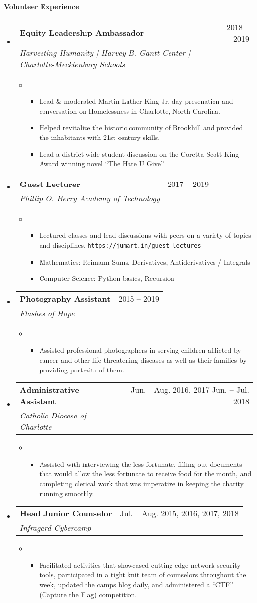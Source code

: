 \documentclass[letterpaper,10pt,draft]{article}
\makeatletter
\newlength{\outerbordwidth}
\newcommand{\openitem}[2]{\item[] \textbf{#1} #2\vspace{2pt}}
\newcommand{\secheading}[1]{\vspace{2pt}
{
\setlength{\FrameSep}{\outerbordwidth}
\textbf{\large #1}
}
}
\newcommand{\secsubheading}[4]{
\vspace{2pt}
\begin{tabular*}{6.86in}{l@{\cftdotfill{\cftsecdotsep}\extracolsep{\fill}}r}
\textbf{#1} & #3 -- #4\\
\textit{#2} \\
\end{tabular*}
}
\newcommand{\secitem}[5]{
\item[]
\secsubheading{#1}{#2}{#3}{#4}
\vspace{-10pt}
\begin{itemize}
\item[]{#5}
\end{itemize}
}
\makeatother
\begin{document}
\secheading{Volunteer Experience}
\begin{itemize}

\secitem{Equity Leadership Ambassador}
{Harvesting Humanity | Harvey B. Gantt Center | Charlotte-Mecklenburg Schools}
{2018}{2019}
{
\begin{itemize}
\openitem{}{Lead \& moderated Martin Luther King Jr. day presenation and conversation on Homelessness in Charlotte, North Carolina.}
\openitem{}{Helped revitalize the historic community of Brookhill and provided the inhabitants with 21st century skills.}
\openitem{}{Lead a district-wide student discussion on the Coretta Scott King Award winning novel ``The Hate U Give''}
\end{itemize}
}

\secitem{Guest Lecturer}
{Phillip O. Berry Academy of Technology}
{2017}{2019}
{
\begin{itemize}
\openitem{}{Lectured classes and lead discussions with peers on a variety of topics and disciplines. \texttt{https://jumart.in/guest-lectures}}
\openitem{}{Mathematics: Reimann Sums, Derivatives, Antiderivatives / Integrals}
\openitem{}{Computer Science: Python basics, Recursion}
\end{itemize}
}
\secitem{Photography Assistant}
{Flashes of Hope}
{2015}{2019}
{
\begin{itemize}
\openitem{}{Assisted professional photographers in serving children afflicted by cancer and other life-threatening diseases as well as their families by providing portraits of them.}
\end{itemize}
}

\secitem{Administrative Assistant}
{Catholic Diocese of Charlotte}
{Jun. - Aug. 2016, 2017 Jun.}{Jul. 2018}
{
\begin{itemize}
\openitem{}{Assisted with interviewing the less fortunate, filling out documents that would allow the less fortunate to receive food for the month, and completing clerical work that was imperative in keeping the charity running smoothly.}
\end{itemize}
}
\secitem{Head Junior Counselor}
{Infragard Cybercamp}
{Jul.}{Aug. 2015, 2016, 2017, 2018}
{
\begin{itemize}
\openitem{}{Facilitated activities that showcased cutting edge network security tools, participated in a tight knit team of counselors throughout the week, updated the camps blog daily, and administered a “CTF” (Capture the Flag) competition.}
\end{itemize}
}

\end{itemize}



\end{document}
